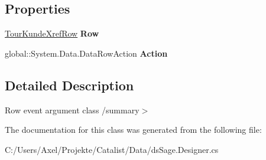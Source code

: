 \subsection*{Properties}
\begin{DoxyCompactItemize}
\item 
\hyperlink{class_products_1_1_data_1_1ds_sage_1_1_tour_kunde_xref_row}{Tour\+Kunde\+Xref\+Row} {\bfseries Row}\hypertarget{class_products_1_1_data_1_1ds_sage_1_1_tour_kunde_xref_row_change_event_a63efb7ffef21e1a5ee387b5fd6568b85}{}\label{class_products_1_1_data_1_1ds_sage_1_1_tour_kunde_xref_row_change_event_a63efb7ffef21e1a5ee387b5fd6568b85}

\item 
global\+::\+System.\+Data.\+Data\+Row\+Action {\bfseries Action}\hypertarget{class_products_1_1_data_1_1ds_sage_1_1_tour_kunde_xref_row_change_event_aa2b604b3971b86f5e6a2c23b825e82b8}{}\label{class_products_1_1_data_1_1ds_sage_1_1_tour_kunde_xref_row_change_event_aa2b604b3971b86f5e6a2c23b825e82b8}

\end{DoxyCompactItemize}


\subsection{Detailed Description}
Row event argument class /summary$>$ 

The documentation for this class was generated from the following file\+:\begin{DoxyCompactItemize}
\item 
C\+:/\+Users/\+Axel/\+Projekte/\+Catalist/\+Data/ds\+Sage.\+Designer.\+cs\end{DoxyCompactItemize}
